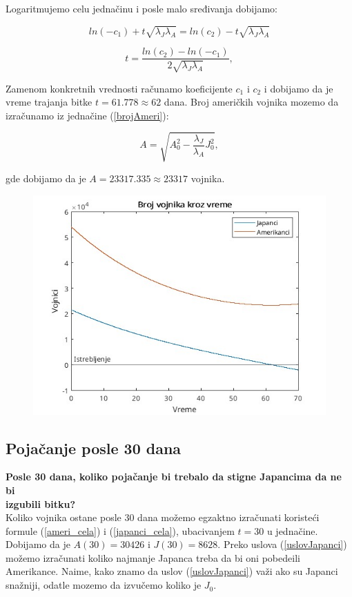 \documentclass{article}
\newcommand{\laj}{\sqrt{\lambda_J\lambda_A}}
\begin{document}
Logaritmujemo celu jednačinu i posle malo sređivanja dobijamo:

\[
  ln(-c_1) + t\laj= ln(c_2) - t\laj
\]

\[
  t = \frac{ln(c_2) - ln(-c_1)}{2\laj}, 
\]

Zamenom konkretnih vrednosti računamo koeficijente \(c_1\) i \(c_2\) i dobijamo da je vreme trajanja bitke \(t = 61.778 \approx 62\) dana.
Broj američkih vojnika mozemo da izračunamo iz jednačine (\ref{brojAmeri}): 

\[
  A = \sqrt{A_{0}^2 - \frac{\lambda_J}{\lambda_A}J_0^2},
\]

gde dobijamo da je \(A =23 317.335 \approx 23 317\) vojnika.


\begin{figure}[htbp]
    \center
    \includegraphics[scale=0.6]{img/bitka.jpg}
\end{figure}

\subsection{Pojačanje posle 30 dana}

\textbf{Posle 30 dana, koliko pojačanje bi trebalo da stigne Japancima da ne bi \\ izgubili bitku?} \\

\hspace{5mm}
Koliko vojnika ostane posle 30 dana možemo egzaktno izračunati koristeći formule
(\ref{ameri_cela}) i (\ref{japanci_cela}), ubacivanjem \(t = 30\) u jednačine.
Dobijamo da je \(A(30) = 30426\) i \(J(30) = 8628\). Preko uslova
(\ref{uslovJapanci}) možemo izračunati koliko najmanje Japanca treba da bi oni
pobedeili Amerikance. Naime, kako znamo da uslov (\ref{uslovJapanci}) važi ako
su Japanci snažniji, odatle mozemo da izvučemo koliko je \(J_0\).
\end{document}
